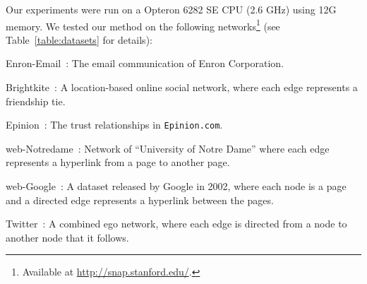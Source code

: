 
Our experiments were run on a Opteron 6282 SE CPU (2.6 GHz) using 12G memory. We tested our method on the following networks\footnote{Available at \url{http://snap.stanford.edu/}.} (see Table~\ref{table:datasets} for details): 
\begin{itemize*}
 \item Enron-Email~\cite{klimt2004introducing}: The email communication of Enron Corporation.
 \item Brightkite~\cite{ChoML11}: A location-based online social network, where each edge represents a friendship tie.
 \item Epinion~\cite{richardson2003trust}: The trust relationships in \texttt{Epinion.com}.
  \item web-Notredame~\cite{notredame}: Network of ``University of Notre Dame'' where each edge represents a hyperlink from a page to another page.
 \item web-Google~\cite{webgoogle}: A dataset released by Google in 2002, where each node is a page and a directed edge represents a hyperlink between the pages.
 \item Twitter~\cite{McAuleyL12}: A combined ego network, where each edge is directed from a node to another node that it follows. 
\end{itemize*}


